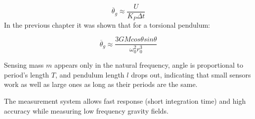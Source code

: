 \documentclass[\main/master.tex]{subfiles}
\begin{document}
\begin{equation}
\overline{\theta}_g \approx \frac{U}{K_P\Delta t}      \label{eqn:pid_gravitation_torque}
\end{equation}
In the previous chapter it was shown that for a torsional pendulum:

\begin{equation}
\overline{\theta}_g \approx \frac{3GMcos\theta sin\theta}{\omega_0^2 r_0^3}    \label{eqn:theta average}
\end{equation}
\par\noindent
Sensing mass $m$ appears only in the natural
frequency, angle is proportional to period's length $T$, and pendulum length $l$ drops out, indicating that small sensors work as well as large ones as long as their periods are the same.
\par\noindent
The measurement system allows fast response (short integration time) and high accuracy while measuring low frequency gravity fields. 

 
 
 
 
\end{document}
